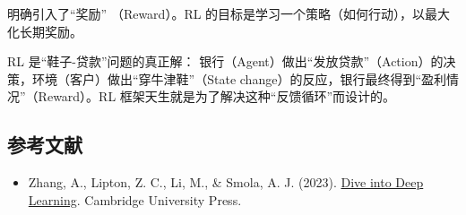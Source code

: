 明确引入了``奖励'' （Reward）。RL 的目标是学习一个策略（如何行动），以最大化长期奖励。

RL 是``鞋子-贷款''问题的真正解： 银行（Agent）做出``发放贷款''（Action）的决策，环境（客户）做出``穿牛津鞋''（State change）的反应，银行最终得到``盈利情况''（Reward）。RL 框架天生就是为了解决这种``反馈循环''而设计的。

\hypertarget{ux53c2ux8003ux6587ux732e-10}{%
\subsection{参考文献}\label{ux53c2ux8003ux6587ux732e-10}}

\vspace{0.25em}
\begin{itemize}
\tightlist
\item
  Zhang, A., Lipton, Z. C., Li, M., \& Smola, A. J. (2023). \href{https://D2L.ai}{Dive into Deep Learning}. Cambridge University Press.
\end{itemize}

\clearpage
